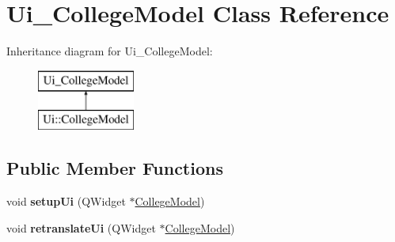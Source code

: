 \hypertarget{class_ui___college_model}{}\section{Ui\+\_\+\+College\+Model Class Reference}
\label{class_ui___college_model}
Inheritance diagram for Ui\+\_\+\+College\+Model\+:\begin{figure}[H]
\begin{center}
\leavevmode
\includegraphics[height=2.000000cm]{class_ui___college_model}
\end{center}
\end{figure}
\subsection*{Public Member Functions}
\begin{DoxyCompactItemize}
\item 
\mbox{\label{class_ui___college_model_ab7cc17baa43b5458dacf9d3709b4078e}} 
void {\bfseries setup\+Ui} (Q\+Widget $\ast$\mbox{\hyperlink{class_college_model}{College\+Model}})
\item 
\mbox{\label{class_ui___college_model_ab6aac2770d1344acccf8aab4858011e4}} 
void {\bfseries retranslate\+Ui} (Q\+Widget $\ast$\mbox{\hyperlink{class_college_model}{College\+Model}})
\end{DoxyCompactItemize}

